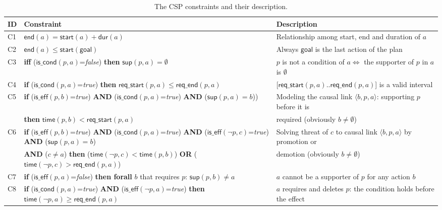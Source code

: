 \documentclass{ecai}
\newcommand{\tup}[1]{{\langle #1 \rangle}}
\newcommand{\dur}{\mathsf{dur}}    %
\newcommand{\iscond}{\mathsf{is\_cond}}    %
\newcommand{\iseff}{\mathsf{is\_eff}}    %
\newcommand{\start}{\mathsf{start}}%
\newcommand{\en}{\mathsf{end}}     %
\newcommand{\supp}{\mathsf{sup}}   %
\newcommand{\tim}{\mathsf{time}}   %
\newcommand{\reqs}{\mathsf{req\_{start}}} %
\newcommand{\reqe}{\mathsf{req\_{end}}}   %
\newcommand{\goal}{\mathsf{goal}}  %
\begin{document}
\begin{table*}
	\begin{center}
		\caption{The CSP constraints and their description.}	
		\begin{scriptsize}
			\begin{tabular}{p{0.1cm}p{10.2cm}p{6.4cm}}
				\hline
				{\bf ID}&{\bf Constraint}&{\bf Description}\\\hline
				C1& $\en(a)=\start(a)+\dur(a)$ & Relationship among start, end and duration of $a$ \\
				
				C2& $\en(a) \leq \start(\goal)$ & Always $\goal$ is the last action of the plan \\
				
				C3& \textbf{iff} ($\iscond(p,a)$=\textit{false}) \textbf{then} $\supp(p,a) = \emptyset$ & $p$ is not a condition of $a \iff $ the supporter of $p$ in $a$ is $\emptyset$ \\
				
				C4& \textbf{if} ($\iscond(p,a)$=\textit{true}) \textbf{then} $\reqs(p,a) \leq \reqe(p,a)$ & [$\reqs(p,a)..\reqe(p,a)$] is a valid interval\\
				
				C5& \textbf{if} ($\iseff(p,b)$=\textit{true}) \textbf{AND} ($\iscond(p,a)$=\textit{true}) \textbf{AND} ($\supp(p,a)=b$))  & Modeling the causal link $\tup{b,p,a}$: supporting $p$ before it is \\
				&\hspace{0.2cm}\textbf{then} $\tim(p,b) < \reqs(p,a)$ & required (obviously $b \neq \emptyset$) \\
				
				C6& \textbf{if} ($\iseff(p,b)$=\textit{true}) \textbf{AND} ($\iscond(p,a)$=\textit{true}) \textbf{AND} ($\iseff(\neg p,c)$=\textit{true}) \textbf{AND} ($\supp(p,a)=b$) & Solving threat of $c$ to causal link $\tup{b,p,a}$ by promotion or \\
				&\hspace{0.2cm}\textbf{AND} ($c \neq a$) \textbf{then} ($\tim(\neg p,c) < \tim(p,b)$) \textbf{OR} ($\tim(\neg p,c) > \reqe(p,a)$) & demotion (obviously $b \neq \emptyset$) \\
				
				C7& \textbf{if} ($\iseff(p,a)$=\textit{false}) \textbf{then forall} $b$ that requires $p$: $\supp(p,b) \neq a$ & $a$ cannot be a supporter of $p$ for any action $b$\\
				
				C8& \textbf{if} ($\iscond(p,a)$=\textit{true}) \textbf{AND} ($\iseff(\neg p,a)$=\textit{true}) \textbf{then} $\tim(\neg p,a) \geq \reqe(p,a)$ & $a$ requires and deletes $p$: the condition holds before the effect \\ 
				

\end{tabular}
\end{scriptsize}
\end{center}
\end{table*}
\end{document}
